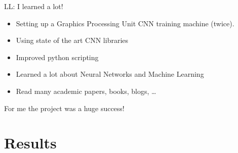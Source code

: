 \documentclass{beamer}
\makeatletter
\newcommand{\mlcell}[1]{\begin{tabular}{@{}c@{}}#1\end{tabular}}
\makeatother
\begin{document}
\begin{frame}{LL: I learned a lot!}
\begin{itemize}
 \item Setting up a Graphics Processing Unit CNN training machine (twice). 
 \item Using state of the art CNN libraries
 \item Improved python scripting 
 \item Learned a lot about Neural Networks and Machine Learning 
 \item Read many academic papers, books, blogs, \ldots 
\end{itemize}
\huge{For me the project was a huge success!}
\end{frame}



\section{Results}
\end{document}

